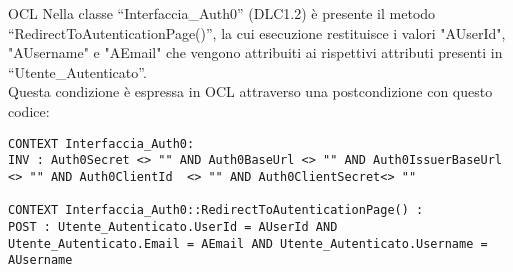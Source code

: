 \begin{listaPersonale}{OCL}
    Nella classe “Interfaccia\_Auth0” (DLC1.2) è presente il metodo “RedirectToAutenticationPage()”, la cui esecuzione restituisce i valori "AUserId", "AUsername" e "AEmail" che vengono attribuiti ai rispettivi attributi presenti in “Utente\_Autenticato”. \\
    Questa condizione è espressa in OCL attraverso una postcondizione con questo codice:
    \begin{lstlisting}
CONTEXT Interfaccia_Auth0:
INV : Auth0Secret <> "" AND Auth0BaseUrl <> "" AND Auth0IssuerBaseUrl <> "" AND Auth0ClientId  <> "" AND Auth0ClientSecret<> ""

CONTEXT Interfaccia_Auth0::RedirectToAutenticationPage() :
POST : Utente_Autenticato.UserId = AUserId AND Utente_Autenticato.Email = AEmail AND Utente_Autenticato.Username = AUsername
    \end{lstlisting}





\end{listaPersonale}
